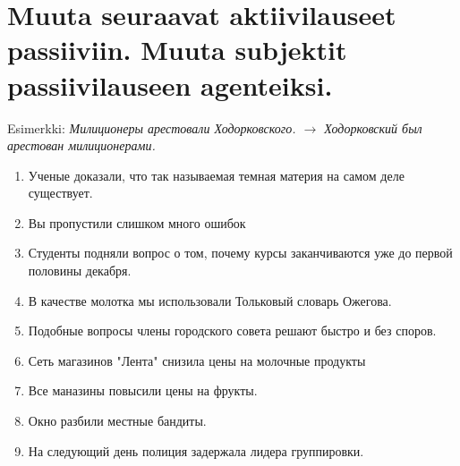 \documentclass[paper=a4, fontsize=11pt]{scrartcl}
\begin{document}
\section{Muuta seuraavat aktiivilauseet passiiviin. Muuta subjektit passiivilauseen agenteiksi.}

Esimerkki: \emph{Милиционеры арестовали Ходорковского. $\rightarrow$ Ходорковский был арестован милиционерами.}

\begin{enumerate}
    \setlength\itemsep{1em}
    \item Ученые доказали, что так называемая темная материя на самом деле существует.\\[.3cm] \underline{\hspace{\textwidth}}
    \item Вы пропустили слишком много ошибок\\[.3cm] \underline{\hspace{\textwidth}}
    \item Студенты подняли вопрос о том, почему курсы заканчиваются уже до первой половины декабря.\\[.3cm] \underline{\hspace{\textwidth}}
    \item В качестве молотка мы использовали Тольковый словарь Ожегова.\\[.3cm] \underline{\hspace{\textwidth}}
    \item Подобные вопросы члены городского совета решают быстро и без споров. \\[.3cm] \underline{\hspace{\textwidth}}
    \item Сеть магазинов "Лента" снизила цены на молочные продукты \\[.3cm] \underline{\hspace{\textwidth}}
    \item Все маназины повысили цены на фрукты.\\[.3cm] \underline{\hspace{\textwidth}}
    \item Окно разбили местные бандиты. \\[.3cm] \underline{\hspace{\textwidth}}
    \item На следующий день полиция задержала лидера группировки. \\[.3cm] \underline{\hspace{\textwidth}}
\end{enumerate}
\end{document}
